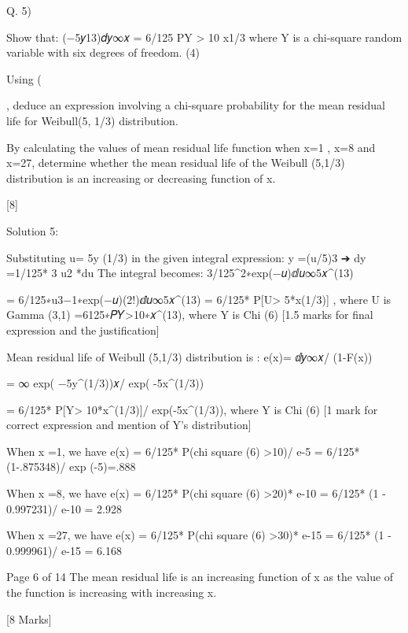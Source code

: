 \documentclass[a4paper,12pt]{article}
\begin{document}



Q. 5)
\item  Show that: \intexp(−5𝑦13)𝑑𝑦∞𝑥 = 6/125 P{Y > 10 x1/3}
where Y is a chi-square random variable with six degrees of freedom.
(4)
\item   Using (\item , deduce an expression involving a chi-square probability for the mean residual life for Weibull(5, 1/3) distribution.


\item   By calculating the values of mean residual life function when x=1 , x=8 and x=27, determine whether the mean residual life of the Weibull (5,1/3) distribution is an increasing or decreasing function of x.

[8]



Solution 5:
\item 
Substituting u= 5y (1/3) in the given integral expression:
y =(u/5)3
➔ dy =1/125* 3 u2 *du 
The integral becomes: 3/125\intu^2∗exp(−𝑢)ⅆ𝑢∞5𝑥^(13)

= 6/125∗u3−1∗exp(−𝑢)(2!)ⅆ𝑢∞5𝑥^(13)
= 6/125* P[U> 5*x(1/3)] , where U is Gamma (3,1) 
=6125∗𝑃{𝑌>10∗𝑥^(13)}, where Y is Chi (6)
[1.5 marks for final expression and the justification]

\item  
Mean residual life of Weibull (5,1/3) distribution is :
e(x)= ⅆ𝑦∞𝑥/ (1-F(x))

= ∞ exp( −5y^(1/3))𝑥/ exp( -5x^(1/3))

= 6/125* P[Y> 10*x^(1/3)]/ exp(-5x^(1/3)), where Y is Chi (6)
[1 mark for correct expression and mention of Y’s distribution]

\item  
When x =1, we have e(x) = 6/125* P(chi square (6) >10)/ e-5
= 6/125* (1-.875348)/ exp (-5)=.888

When x =8, we have e(x) = 6/125* P(chi square (6) >20)* e-10
= 6/125* (1 - 0.997231)/ e-10 = 2.928

When x =27, we have e(x) = 6/125* P(chi square (6) >30)* e-15
= 6/125* (1 - 0.999961)/ e-15 = 6.168

Page 6 of 14
The mean residual life is an increasing function of x as the value of the function is increasing with increasing x.


[8 Marks]
\end{document}

